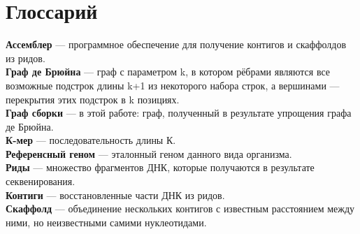 \documentclass[14pt]{matmex-diploma-custom}
\begin{document}

\section*{Глоссарий}

\textbf{Ассемблер} --- программное обеспечение для получение контигов и скаффолдов из ридов.\\

\textbf{Граф де Брюйна} --- граф с параметром k, в котором рёбрами являются все возможные подстрок длины k+1 из некоторого набора строк, а вершинами --- перекрытия этих подстрок в k позициях.\\

\textbf{Граф сборки} --- в этой работе: граф, полученный в результате упрощения графа де Брюйна.\\

\textbf{К-мер} --- последовательность длины К.\\


\textbf{Референсный геном} --- эталонный геном данного вида организма.\\

\textbf{Риды} --- множество фрагментов ДНК, которые получаются в результате секвенирования.\\

\textbf{Контиги} --- восстановленные части ДНК из ридов.\\

\textbf{Скаффолд} --- объединение нескольких контигов с известным расстоянием между ними, но неизвестными самими нуклеотидами.\\


\setmonofont[Mapping=tex-text]{CMU Typewriter Text}


\end{document}
